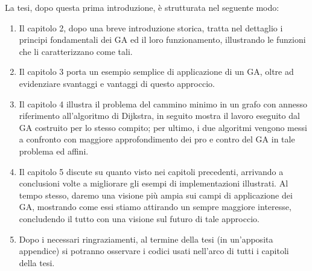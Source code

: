 La tesi, dopo questa prima introduzione, \`e strutturata nel seguente modo:
\begin{enumerate}
    \item Il capitolo 2, dopo una breve introduzione storica, tratta nel dettaglio i principi fondamentali dei GA ed il loro funzionamento, illustrando le funzioni che li caratterizzano come tali.
    \item Il capitolo 3 porta un esempio semplice di applicazione di un GA, oltre ad evidenziare svantaggi e vantaggi di questo approccio.
    \item Il capitolo 4 illustra il problema del cammino minimo in un grafo con annesso riferimento all'algoritmo di Dijkstra, in seguito mostra il lavoro eseguito dal GA costruito per lo stesso compito; per ultimo, i due algoritmi vengono messi a confronto con maggiore approfondimento dei pro e contro del GA in tale problema ed affini.
    \item Il capitolo 5 discute su quanto visto nei capitoli precedenti, arrivando a conclusioni volte a migliorare gli esempi di implementazioni illustrati. Al tempo stesso, daremo una visione pi\`u ampia sui campi di applicazione dei GA, mostrando come essi stiamo attirando un sempre maggiore interesse, concludendo il tutto con una visione sul futuro di tale approccio.
    \item Dopo i necessari ringraziamenti, al termine della tesi (in un'apposita appendice) si potranno osservare i codici usati nell'arco di tutti i capitoli della tesi.
\end{enumerate}
\newpage